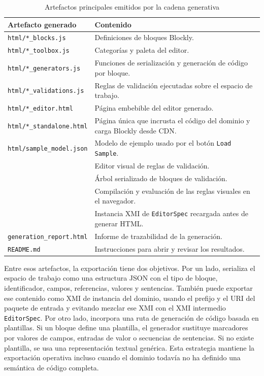 \begin{table}[htbp]
  \centering
  \small
  \begin{tabular}{|L{0.32\textwidth}|L{0.54\textwidth}|}
    \hline
    Artefacto generado & Contenido \\
    \hline
    \texttt{html/*\_blocks.js} & Definiciones de bloques Blockly. \\
    \texttt{html/*\_toolbox.js} & Categorías y paleta del editor. \\
    \texttt{html/*\_generators.js} & Funciones de serialización y generación de
    código por bloque. \\
    \texttt{html/*\_validations.js} & Reglas de validación ejecutadas sobre el
    espacio de trabajo. \\
    \texttt{html/*\_editor.html} & Página embebible del editor generado. \\
    \texttt{html/*\_standalone.html} & Página única que incrusta el código del
    dominio y carga Blockly desde CDN. \\
    \texttt{html/sample\_model.json} & Modelo de ejemplo usado por el botón
    \texttt{Load Sample}. \\
     & Editor visual de reglas de
    validación. \\
     & Árbol serializado de bloques de
    validación. \\
     & Compilación y evaluación de las reglas
    visuales en el navegador. \\
     & Instancia XMI de
    \texttt{EditorSpec} recargada antes de generar HTML. \\
    \texttt{generation\_report.html} & Informe de trazabilidad de la generación. \\
    \texttt{README.md} & Instrucciones para abrir y revisar los resultados. \\
    \hline
  \end{tabular}
  \caption{Artefactos principales emitidos por la cadena generativa}
  \label{tab:artefactos-generados}
\end{table}

Entre esos artefactos, la exportación tiene dos objetivos. Por un lado,
serializa el espacio de trabajo como una estructura JSON con el tipo de bloque,
identificador, campos, referencias, valores y sentencias. También puede exportar
ese contenido como XMI de instancia del dominio, usando el prefijo y el URI del
paquete de entrada y evitando mezclar ese XMI con el XMI intermedio
\texttt{EditorSpec}. Por otro lado, incorpora una ruta de generación de código
basada en plantillas. Si un bloque define una plantilla, el generador sustituye
marcadores por valores de campos, entradas de valor o secuencias de sentencias.
Si no existe plantilla, se usa una representación textual genérica. Esta
estrategia mantiene la exportación operativa incluso cuando el dominio todavía
no ha definido una semántica de código completa.

